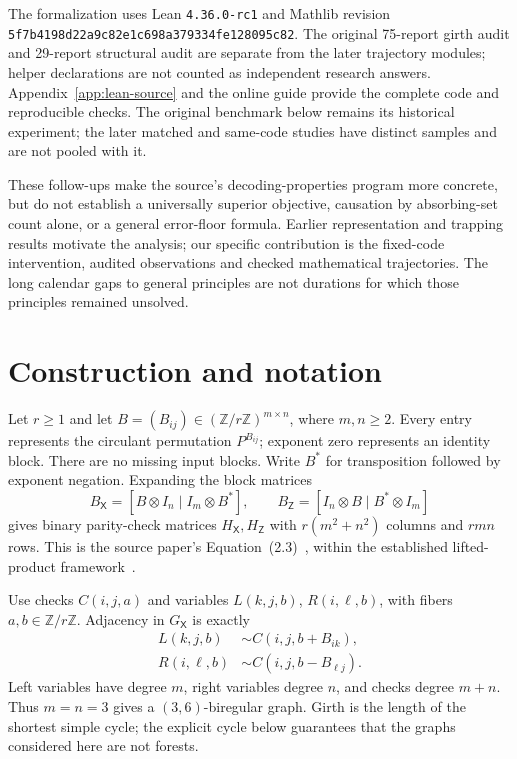 \documentclass[11pt]{article}
\theoremstyle{definition}
\theoremstyle{remark}
\newcommand{\Zr}{\mathbb Z/r\mathbb Z}
\newcommand{\HX}{H_{\mathsf X}}
\newcommand{\HZ}{H_{\mathsf Z}}
\newcommand{\GX}{G_{\mathsf X}}
\begin{document}
The formalization uses Lean \texttt{4.36.0-rc1} and Mathlib revision
\nolinkurl{5f7b4198d22a9c82e1c698a379334fe128095c82}. The original
75-report girth audit and 29-report structural audit are separate from
the later trajectory modules; helper declarations are not counted as
independent research answers. Appendix~\ref{app:lean-source} and the online
guide provide the complete code and reproducible checks. The original
benchmark below remains its historical experiment; the later matched and
same-code studies have distinct samples and are not pooled with it.

These follow-ups make the source's decoding-properties program more
concrete, but do not establish a universally superior objective, causation
by absorbing-set count alone, or a general error-floor formula. Earlier
representation and trapping results motivate the analysis; our specific
contribution is the fixed-code intervention, audited observations and
checked mathematical trajectories. The long calendar gaps to general
principles are not durations for which those principles remained unsolved.

\section{Construction and notation}\label{sec:model}

Let $r\ge1$ and let $B=(B_{ij})\in(\Zr)^{m\times n}$, where $m,n\ge2$.
Every entry represents the circulant permutation $P^{B_{ij}}$; exponent
zero represents an identity block. There are no missing input blocks.
Write $B^*$ for transposition followed by exponent negation. Expanding the
block matrices
\begin{equation}\label{eq:lp}
 B_{\mathsf X}=[B\otimes I_n\mid I_m\otimes B^*],\qquad
 B_{\mathsf Z}=[I_n\otimes B\mid B^*\otimes I_m]
\end{equation}
gives binary parity-check matrices $\HX,\HZ$ with
$r(m^2+n^2)$ columns and $rmn$ rows. This is the source paper's
Equation~(2.3)~\cite{FHM2026}, within the established lifted-product
framework~\cite{PK2021,RDV2025}.

Use checks $C(i,j,a)$ and variables $L(k,j,b)$, $R(i,\ell,b)$, with fibers
$a,b\in\Zr$. Adjacency in $\GX$ is exactly
\begin{align}
 L(k,j,b)&\sim C(i,j,b+B_{ik}),\label{eq:left}\\
 R(i,\ell,b)&\sim C(i,j,b-B_{\ell j}).\label{eq:right}
\end{align}
Left variables have degree $m$, right variables degree $n$, and checks
degree $m+n$. Thus $m=n=3$ gives a $(3,6)$-biregular graph. Girth is the
length of the shortest simple cycle; the explicit cycle below guarantees
that the graphs considered here are not forests.
\end{document}
